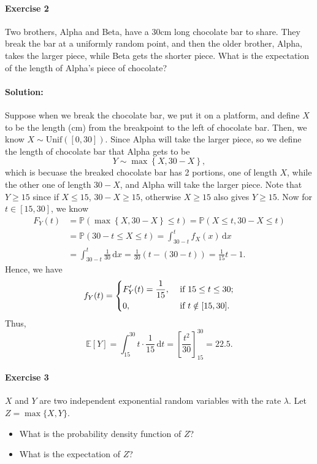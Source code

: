 \documentclass[a4paper,12pt]{article}
\begin{document}
\paragraph{Exercise 2} Two brothers, Alpha and Beta, have a 30cm long chocolate bar to share. They break the bar at a uniformly random point, and then the older brother, Alpha, takes the larger piece, while Beta gets the shorter piece. What is the expectation of the length of Alpha's piece of chocolate?

\paragraph{Solution:} Suppose when we break the chocolate bar, we put it on a platform, and define \(X\) to be the length (cm) from the breakpoint to the left of chocolate bar. Then, we know \(X \sim \mathrm{Unif}([0, 30])\). Since Alpha will take the larger piece, so we define the length of chocolate bar that Alpha gets to be 
\[
	Y \sim \max \left\{ X, 30 - X \right\},  
\] 
which is becuase the breaked chocolate bar has 2 portions, one of length \(X\), while the other one of length \(30 - X\), and Alpha will take the larger piece. Note that \(Y \ge 15\) since if \(X \le 15\), \(30 - X \ge 15\), otherwise \(X \ge 15\) also gives \(Y \ge 15\). Now for \(t \in [15, 30]\), we know 
\begin{align*}
	F_Y(t) &= \mathbb{P} \left( \max \left\{ X, 30 - X \right\} \le t  \right) = \mathbb{P} (X \le t, 30 - X \le t) \\
	&= \mathbb{P} (30 - t \le X \le t) = \int _{30 - t}^t f_X(x) \, \mathrm{d} x \\
	&= \int _{30 - t}^t \frac{1}{30} \, \mathrm{d} x = \frac{1}{30} \left( t - (30 - t) \right) = \frac{1}{15} t - 1.    
\end{align*}   
Hence, we have 
\[
	f_Y(t) = \begin{dcases}
		F_Y^{\prime} (t) = \frac{1}{15}, &\text{ if } 15 \le t \le 30 ;\\
		0, &\text{ if } t \notin [15, 30].
	\end{dcases}
\]     
Thus, 
\[
	\mathbb{E} [Y] = \int _{15}^{30} t \cdot \frac{1}{15} \, \mathrm{d} t = \left[ \frac{t^2}{30} \right]_{15}^{30} = 22.5.  
\]

\paragraph{Exercise 3} $X$ and $Y$ are two independent exponential random variables with the rate $\lambda$. Let $Z = \max \{ X, Y \}$.
\begin{itemize}
	\item[(a)] What is the probability density function of $Z$?
	\item[(b)] What is the expectation of $Z$?
\end{itemize}
\end{document}
